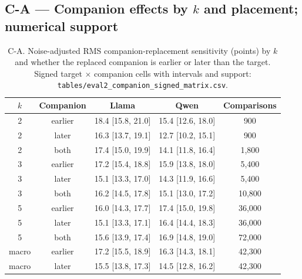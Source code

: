 \subsection*{C-A --- Companion effects by $k$ and placement; numerical support}
\begin{table}[h]
\centering\scriptsize
\caption{C-A. Noise-adjusted RMS companion-replacement sensitivity (points) by $k$ and whether the replaced companion is earlier or later than the target. Signed target $\times$ companion cells with intervals and support: \texttt{tables/eval2\_companion\_signed\_matrix.csv}.}
\label{tab:CA}
\begin{tabular}{ccccc}
\toprule
$k$ & Companion & Llama & Qwen & Comparisons \\
\midrule
2 & earlier & 18.4 [15.8, 21.0] & 15.4 [12.6, 18.0] & 900 \\
2 & later & 16.3 [13.7, 19.1] & 12.7 [10.2, 15.1] & 900 \\
2 & both & 17.4 [15.0, 19.9] & 14.1 [11.8, 16.4] & 1,800 \\
3 & earlier & 17.2 [15.4, 18.8] & 15.9 [13.8, 18.0] & 5,400 \\
3 & later & 15.1 [13.3, 17.0] & 14.3 [11.9, 16.6] & 5,400 \\
3 & both & 16.2 [14.5, 17.8] & 15.1 [13.0, 17.2] & 10,800 \\
5 & earlier & 16.0 [14.3, 17.7] & 17.4 [15.0, 19.8] & 36,000 \\
5 & later & 15.1 [13.3, 17.1] & 16.4 [14.4, 18.3] & 36,000 \\
5 & both & 15.6 [13.9, 17.4] & 16.9 [14.8, 19.0] & 72,000 \\
macro & earlier & 17.2 [15.5, 18.9] & 16.3 [14.3, 18.1] & 42,300 \\
macro & later & 15.5 [13.8, 17.3] & 14.5 [12.8, 16.2] & 42,300 \\
\bottomrule
\end{tabular}
\end{table}

